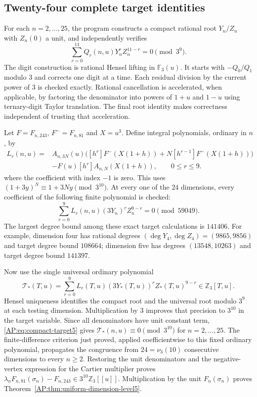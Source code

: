 \documentclass[11pt,a4paper]{article}
\theoremstyle{definition}\newtheorem{definition}[theorem]{Definition}
\theoremstyle{remark}\newtheorem{remark}[theorem]{Remark}
\numberwithin{equation}{section}
\begin{document}
\subsection{Twenty-four complete target identities}
For each $n=2,\ldots,25$, the program constructs a compact rational
root $Y_n/Z_n$ with $Z_n(0)$ a unit, and independently verifies
\[
 \sum_{r=0}^{11}Q_r(n,u)Y_n^rZ_n^{11-r}=0\pmod{3^9}.
\]
The digit construction is rational Hensel lifting in $\mathbb F_3(u)$.
It starts with $-Q_0/Q_1$ modulo $3$ and corrects one digit at a time.
Each residual division by the current power of $3$ is checked
exactly.  Rational cancellation is accelerated, when applicable,
by factoring the denominator into powers of $1+u$ and $1-u$ using
ternary-digit Taylor translation.  The final root identity makes
correctness independent of trusting that acceleration.

Let $F=F_{n,243}$, $F^-=F_{n,81}$ and $X=u^3$.  Define integral
polynomials, ordinary in $n$, by
\[
 \begin{aligned}
 L_r(n,u)={}&A_{n,3N}(u)
 \bigl([h^r]F^-(X(1+h))+N[h^{r-1}]F^-(X(1+h))\bigr)\\
 &-F(u)[h^r]A_{n,N}(X(1+h)),\qquad0\leq r\leq9.
 \end{aligned}
\]
where the coefficient with index $-1$ is zero.  This uses
$(1+3y)^N\equiv1+3Ny\pmod{3^{10}}$.
At every one of the $24$ dimensions, every coefficient of the
following finite polynomial is checked:
\begin{equation}\label{AP:eq:compact-target5}
 \sum_{r=0}^9L_r(n,u)(3Y_n)^rZ_n^{9-r}=0\pmod{59049}.
\end{equation}
The largest degree bound among these exact target calculations is
$141406$.  For example, dimension four has rational degrees
$(\deg Y_4,\deg Z_4)=(9865,9856)$ and target degree bound $108664$;
dimension five has degrees $(13548,10263)$ and target degree bound
$141397$.

Now use the single universal ordinary polynomial
\[
 \mathcal T_*(T,u)=\sum_{r=0}^9
 L_r(T,u)(3Y_*(T,u))^rZ_*(T,u)^{9-r}
                         \in\mathbb Z_3[T,u].
\]
Hensel uniqueness identifies the compact root and the universal
root modulo $3^9$ at each testing dimension.  Multiplication by $3$
improves that precision to $3^{10}$ in the target variable.  Since
all denominators have unit constant term,
\eqref{AP:eq:compact-target5} gives
$\mathcal T_*(n,u)\equiv0\pmod{3^{10}}$ for $n=2,\ldots,25$.
The finite-difference criterion just proved, applied coefficientwise
to this fixed ordinary polynomial, propagates the congruence from
$24=\nu_3(10)$ consecutive dimensions to every $n\geq2$.
Restoring the unit denominators and the negative-vertex expression
for the Cartier multiplier proves
$\lambda_nF_{n,81}(\sigma_n)-F_{n,243}\in3^{10}\mathbb Z_3[[u]]$.
Multiplication by the unit $F_n(\sigma_n)$ proves
Theorem~\ref{AP:thm:uniform-dimension-level5}.
\end{document}

